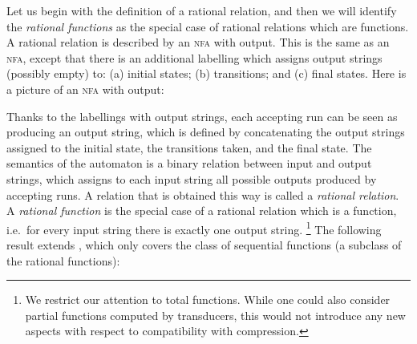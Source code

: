 \documentclass[a4paper,UKenglish,cleveref, autoref, thm-restate]{lipics-v2021}
\newcommand{\nfa}{{\textsc{nfa}}\xspace}
\begin{document}
Let us begin with the definition of a {rational relation}, and then we will identify the \emph{rational functions} as the special case of rational relations which are functions. A rational relation is described by an \nfa with output. This is the same as an \nfa, except that there is an additional labelling which assigns output strings (possibly empty) to: (a) initial states; (b) transitions; and (c) final states. Here is a picture of an \nfa with output: 
\begin{center}
\end{center}
Thanks to the labellings with output strings, each accepting run can be seen as producing an output string, which is defined by concatenating the output strings assigned to the initial state, the transitions taken, and the final state. 
The semantics of the automaton is a binary relation between input and output strings, which assigns to each input string all possible outputs produced by accepting runs. A relation that is obtained this way is called a \emph{rational relation}. A \emph{rational function} is the special case of a rational relation which is a function, i.e.~for every input string there is exactly one output string. 
\footnote{We restrict our attention to total functions. While one could also consider partial functions computed by transducers, this would not introduce any new aspects with respect to compatibility with compression.}
The following result extends \cite[Theorem~1]{BeChRa08}, which only covers the 
class of sequential functions (a subclass of the rational functions):
\end{document}
